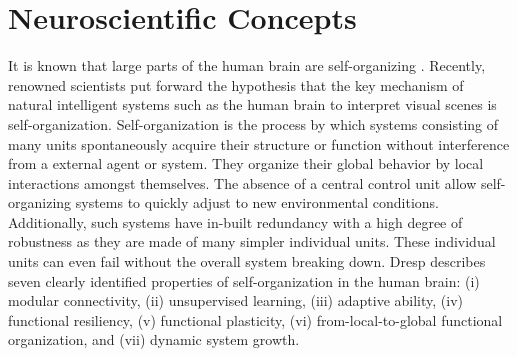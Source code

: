 
\section{Neuroscientific Concepts}




It is known that large parts of the human brain are self-organizing .
Recently, renowned scientists  put forward the hypothesis that the key mechanism of natural intelligent systems such as the human brain to interpret visual scenes is self-organization.
Self-organization is the process by which systems consisting of many units spontaneously acquire their structure or function without interference from a external agent or system.
They organize their global behavior by local interactions amongst themselves.
The absence of a central control unit allow self-organizing systems to quickly adjust to new environmental conditions.
Additionally, such systems have in-built redundancy with a high degree of robustness as they  are made of many simpler individual units.
These individual units can even fail without the overall system breaking down.
Dresp  describes seven clearly identified properties of self-organization in the human brain: (i) modular connectivity, (ii) unsupervised learning, (iii) adaptive ability, (iv) functional resiliency, (v) functional plasticity, (vi) from-local-to-global functional organization, and (vii) dynamic system growth.


